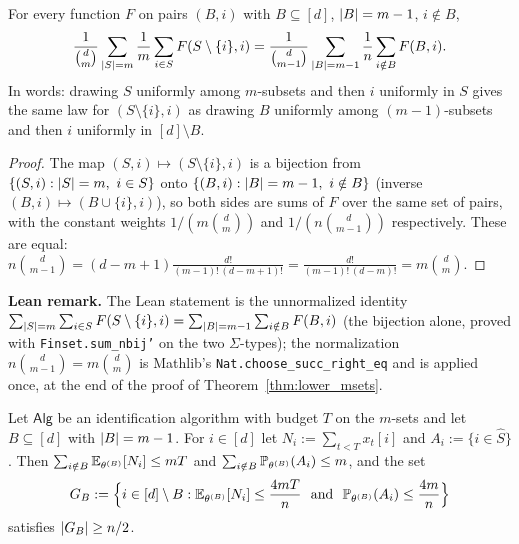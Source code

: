 \begin{lemma}\label{lem:msets_equivalent_sampling}
\leanok
{}
For every function $F$ on pairs $(B, i)$ with $B \subseteq [d]$, $\lvert B \rvert = m-1$, $i \notin B$,
\[
  \frac{1}{\binom dm}\sum_{\lvert S \rvert = m}\frac1m\sum_{i\in S}F(S\setminus\{i\}, i)
  = \frac{1}{\binom{d}{m-1}}\sum_{\lvert B \rvert = m-1}\frac1n\sum_{i\notin B}F(B, i).
\]
In words: drawing $S$ uniformly among $m$-subsets and then $i$ uniformly in $S$ gives the
same law for $(S\setminus\{i\}, i)$ as drawing $B$ uniformly among $(m-1)$-subsets and then
$i$ uniformly in $[d]\setminus B$.
\end{lemma}

\begin{proof}
\leanok
{}
The map $(S, i) \mapsto (S\setminus\{i\}, i)$ is a bijection from
$\{(S,i) : \lvert S \rvert = m,\ i \in S\}$ onto $\{(B,i) : \abs B = m-1,\ i\notin B\}$ (inverse
$(B,i)\mapsto(B\cup\{i\},i)$), so both sides are sums of $F$ over the same set of pairs,
with the constant weights $1/(m\binom dm)$ and $1/(n\binom{d}{m-1})$ respectively. These
are equal: $n\binom{d}{m-1} = (d-m+1)\frac{d!}{(m-1)!\,(d-m+1)!} = \frac{d!}{(m-1)!\,(d-m)!} = m\binom dm$.
\end{proof}

\textbf{Lean remark.} The Lean statement is the unnormalized identity
$\sum_{\lvert S \rvert = m}\sum_{i\in S}F(S\setminus\{i\},i) = \sum_{\lvert B \rvert = m-1}\sum_{i\notin B}F(B,i)$
(the bijection alone, proved with \texttt{Finset.sum\_nbij'} on the two $\Sigma$-types); the
normalization $n\binom{d}{m-1} = m\binom dm$ is Mathlib's
\texttt{Nat.choose\_succ\_right\_eq} and is applied once, at the end of the proof of
Theorem~\ref{thm:lower_msets}.

\begin{lemma}\label{lem:msets_good_set}
Let $\mathsf{Alg}$ be an identification algorithm with budget $T$ on the $m$-sets and let
$B \subseteq [d]$ with $\lvert B \rvert = m-1$. For $i \in [d]$ let $N_i := \sum_{t<T}x_t[i]$ and
$A_i := \{i \in \hat S\}$. Then
$\sum_{i\notin B}\mathbb{E}_{\theta^{(B)}}[N_i] \le mT$ and $\sum_{i\notin B}\mathbb{P}_{\theta^{(B)}}(A_i) \le m$,
and the set
\[
  G_B := \Big\{i \in [d]\setminus B : \mathbb{E}_{\theta^{(B)}}[N_i] \le \frac{4mT}{n}
  \ \text{ and }\ \mathbb{P}_{\theta^{(B)}}(A_i) \le \frac{4m}{n}\Big\}
\]
satisfies $\lvert G_B \rvert \ge n/2$.
\end{lemma}

